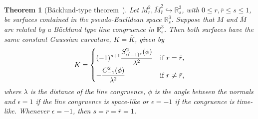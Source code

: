 \documentclass[pdftex]{sigma}
\numberwithin{equation}{section}
\newtheorem{Theorem}{Theorem}[section]
\begin{document}
\begin{Theorem}[B\"acklund-type theorem~\cite{KRT2022}]\label{TBT}
Let $M^2_{r},\bar{M}^2_{\bar{r}}\hookrightarrow{\mathbb{R}}^3_{s}$, with $0\leq r,\bar{r}\leq s\leq 1$, be surfaces contained in the pseudo-Euclidean space ${\mathbb{R}}^3_s$. Suppose that $M$ and $\bar{M}$ are related by a B\"acklund type line congruence in ${\mathbb{R}}^3_{s}$. Then both surfaces have the same constant Gaussian curvature, $K=\bar{K}$, given by
\begin{equation}\label{KTB}
K=
\begin{cases}
\displaystyle(-1)^{s+1}\frac{S^2_{\epsilon(-1)^s}(\phi)}{\lambda^2} &\mbox{if} \ r=\bar{r},\vspace{1mm}\\
\displaystyle-\frac{C^2_{-1}(\phi)}{\lambda^2} &\mbox{if} \ r\neq \bar{r},
\end{cases}
\end{equation}
where $\lambda$ is the distance of the line congruence, $\phi$ is the angle between the normals and
 $\epsilon=1$ if the line congruence is space-like or $\epsilon=-1$ if the congruence is time-like. Whenever $\epsilon=-1$, then $s=r=\bar{r}=1$.
\end{Theorem}
\end{document}
